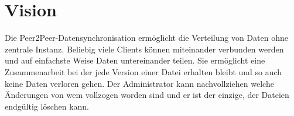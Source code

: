\chapter{Vision}

Die Peer2Peer-Datensynchronisation ermöglicht die Verteilung von Daten ohne zentrale Instanz. Beliebig viele Clients können miteinander verbunden werden und auf einfachste Weise Daten untereinander teilen. Sie ermöglicht eine Zusammenarbeit bei der jede Version einer Datei erhalten bleibt und so auch keine Daten verloren gehen. Der Administrator kann nachvollziehen welche Änderungen von wem vollzogen worden sind und er ist der einzige, der Dateien endgültig löschen kann.
